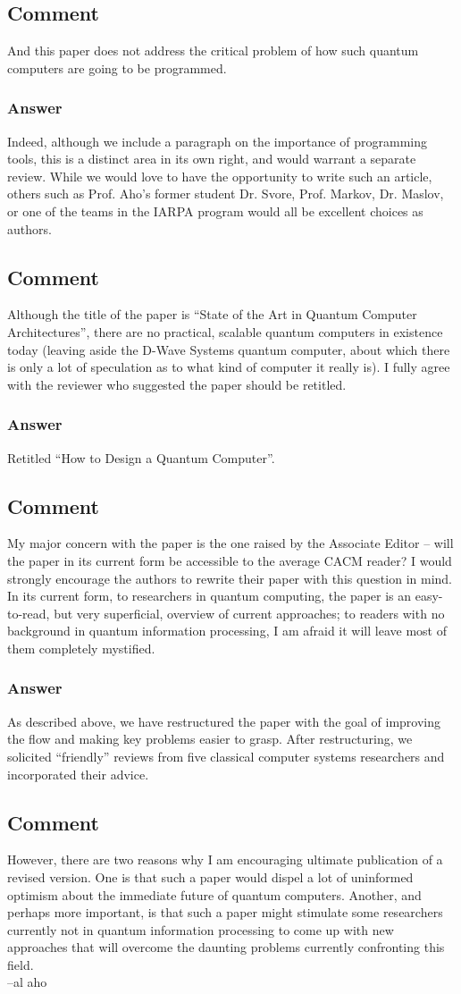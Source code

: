 \documentclass{article}
\newcommand{\comment}{\subsection{Comment}\em}
\newcommand{\answer}{\rm \subsubsection*{Answer}}
\begin{document}
\comment

And this paper does not address the critical problem of how such
quantum computers are going to be programmed.

\answer

Indeed, although we include a paragraph on the importance of
programming tools, this is a distinct area in its own right, and would
warrant a separate review.  While we would love to have the
opportunity to write such an article, others such as Prof. Aho's
former student Dr. Svore, Prof. Markov, Dr. Maslov, or one of the
teams in the IARPA program would all be excellent choices as authors.

\comment

Although the title of the paper is ``State of the Art in Quantum
Computer Architectures'', there are no practical, scalable quantum
computers in existence today (leaving aside the D-Wave Systems quantum
computer, about which there is only a lot of speculation as to what
kind of computer it really is). I fully agree with the reviewer who
suggested the paper should be retitled.

\answer

Retitled ``How to Design a Quantum Computer''.

\comment

My major concern with the paper is the one raised by the Associate
Editor -- will the paper in its current form be accessible to the
average CACM reader? I would strongly encourage the authors to rewrite
their paper with this question in mind. In its current form, to
researchers in quantum computing, the paper is an easy-to-read, but
very superficial, overview of current approaches; to readers with no
background in quantum information processing, I am afraid it will
leave most of them completely mystified.

\answer

As described above, we have restructured the paper with the goal of
improving the flow and making key problems easier to grasp.  After
restructuring, we solicited ``friendly'' reviews from five classical
computer systems researchers and incorporated their advice.

\comment

However, there are two reasons why I am encouraging ultimate
publication of a revised version.  One is that such a paper would
dispel a lot of uninformed optimism about the immediate future of
quantum computers. Another, and perhaps more important, is that such a
paper might stimulate some researchers currently not in quantum
information processing to come up with new approaches that will
overcome the daunting problems currently confronting this field.\\
 --al aho
\end{document}
